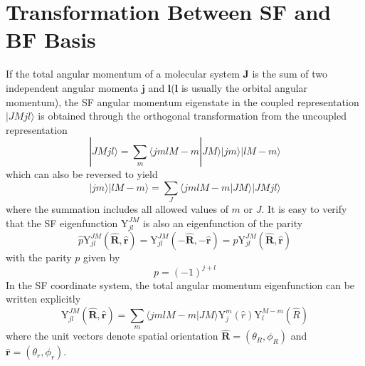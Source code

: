 \documentclass[]{article}
\begin{document}
\section{Transformation Between SF and BF Basis}
If the total angular momentum of a molecular system $\mathbf{J}$ is the sum of two independent angular momenta $\mathbf{j}$ and $\mathbf{l}$($\mathbf{l}$ is usually the orbital angular momentum), the SF angular momentum eigenstate in the coupled representation $|JMjl\rangle$ is obtained through the orthogonal transformation from the uncoupled representation 
\begin{equation}
	|JMjl\rangle =\sum\limits_m\langle jmlM-m|JM\rangle|jm\rangle|lM-m\rangle
\end{equation}
which can also be reversed to yield
\begin{equation}
	|jm\rangle|lM-m\rangle=\sum\limits_J\langle jmlM-m|JM\rangle|JMjl\rangle
\end{equation}
where the summation includes all allowed values of $m$ or $J$. It is easy to verify that the SF eigenfunction $\mathrm{Y}^{JM}_{jl}$ is also an eigenfunction of the parity 
\begin{equation}
	\hat{p}\mathrm{Y}^{JM}_{jl}(\mathbf{\hat{R}},\mathbf{\hat{r}})=\mathrm{Y}^{JM}_{jl}(\mathbf{-\hat{R}},-\mathbf{\hat{r}})=p\mathrm{Y}^{JM}_{jl}(\mathbf{\hat{R}},\mathbf{\hat{r}})
\end{equation}
with the parity $p$ given by
\begin{equation}
	p=(-1)^{j+l}
	\label{d23}
\end{equation}
In the SF coordinate system, the total angular momentum eigenfunction can be written explicitly
\begin{equation}
	\mathrm{Y}^{JM}_{jl}(\mathbf{\hat{R}},\mathbf{\hat{r}})=\sum\limits_m\langle jmlM-m|JM\rangle\mathrm{Y}^m_j(\hat{r})\mathrm{Y}^{M-m}_l(\hat{R})
\end{equation}
where the unit vectors denote spatial orientation $\mathbf{\hat{R}}=(\theta_R,\phi_R)$ and $\mathbf{\hat{r}}=(\theta_r,\phi_r)$.
\end{document}

